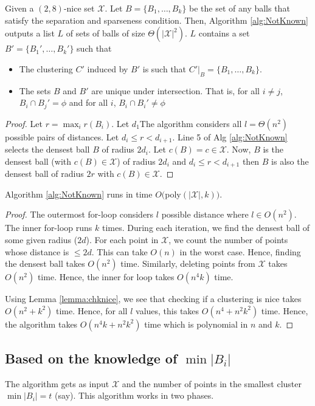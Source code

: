\documentclass[11pt]{article}
\begin{document}
\begin{theorem}
Given a $(2,8)$-nice set $\mathcal{X}$. Let $B = \{B_1,\ldots,B_k\}$ be the set of any balls that satisfy the separation and sparseness condition. Then, Algorithm \ref{alg:NotKnown} outputs a list $L$ of sets of balls of size $\Theta(|\mathcal{X}|^2)$. $L$ contains a set $B' = \{B_1',\ldots,B_k'\}$ such that 
\begin{itemize}
	\item The clustering $C'$ induced by $B'$ is such that $C'|_B = \{B_1,\ldots,B_k\}$.
	\item The sets $B$ and $B'$ are unique under intersection. That is, for all $i\neq j$, $B_i \cap B_j' = \phi$ and for all $i$, $B_i \cap B_i' \neq \phi$
\end{itemize}

\end{theorem}
\begin{proof}
Let $r = \max_i r(B_i)$. Let $d_1$The algorithm considers all $l = \Theta(n^2)$ possible pairs of distances. Let $d_i \le r < d_{i+1}$. Line 5 of Alg \ref{alg:NotKnown} selects the densest ball $B$ of radius $2d_i$. Let $c(B) = c \in \mathcal{X}$. Now, $B$ is the densest ball (with $c(B) \in \mathcal{X}$) of radius $2d_i$ and $d_i \le r < d_{i+1}$ then $B$ is also the densest ball of radius $2r$ with $c(B) \in \mathcal{X}$. 
\end{proof}

\begin{theorem}
Algorithm \ref{alg:NotKnown} runs in time $O($poly$(|\mathcal{X}|,k))$.
\end{theorem}
\begin{proof}
The outermost for-loop considers $l$ possible distance where $l \in O(n^2)$. The inner for-loop runs $k$ times. During each iteration, we find the densest ball of some given radius ($2d$). For each point in $\mathcal{X}$, we count the number of points whose distance is $\le 2d$. This can take $O(n)$ in the worst case. Hence, finding the densest ball takes $O(n^2)$ time. Similarly, deleting points from $\mathcal{X}$ takes $O(n^2)$ time. Hence, the inner for loop takes $O(n^4k)$ time.

Using Lemma \ref{lemma:chknice}, we see that checking if a clustering is nice takes $O(n^2+k^2)$ time. Hence, for all $l$ values, this takes $O(n^4+n^2k^2)$ time. Hence, the algorithm takes $O(n^4k+n^2k^2)$ time which is polynomial in $n$ and $k$.
\end{proof}

\subsection{Based on the knowledge of $\min |B_i|$}
The algorithm gets as input $\mathcal{X}$ and the number of points in the smallest cluster $\min |B_i| = t$ (say). This algorithm works in two phases.
\end{document}
